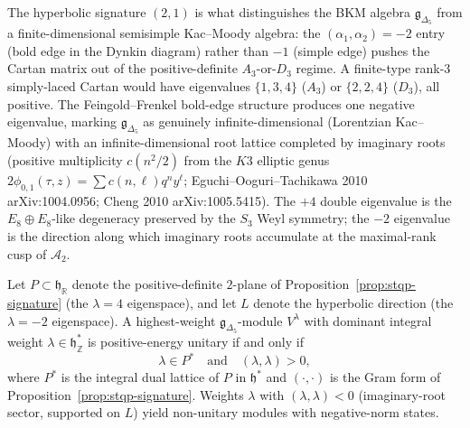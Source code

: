 \begin{remark}
\label{rem:stqp-signature-scope}
The hyperbolic signature $(2, 1)$ is what distinguishes the BKM
algebra $\mathfrak g_{\Delta_5}$ from a finite-dimensional
semisimple Kac--Moody algebra: the $(\alpha_1, \alpha_2) = -2$
entry (bold edge in the Dynkin diagram) rather than $-1$ (simple
edge) pushes the Cartan matrix out of the positive-definite
$A_3$-or-$D_3$ regime. A finite-type rank-$3$ simply-laced
Cartan would have eigenvalues $\{1, 3, 4\}$ ($A_3$) or
$\{2, 2, 4\}$ ($D_3$), all positive. The Feingold--Frenkel
bold-edge structure produces one negative eigenvalue, marking
$\mathfrak g_{\Delta_5}$ as genuinely infinite-dimensional
(Lorentzian Kac--Moody) with an infinite-dimensional root
lattice completed by imaginary roots (positive multiplicity
$c(n^2/2)$ from the $K3$ elliptic genus
$2\phi_{0,1}(\tau, z) = \sum c(n, \ell) q^n y^\ell$;
Eguchi--Ooguri--Tachikawa 2010 arXiv:1004.0956; Cheng 2010
arXiv:1005.5415). The $+4$ double eigenvalue is the
$E_8\oplus E_8$-like degeneracy preserved by the $S_3$ Weyl
symmetry; the $-2$ eigenvalue is the direction along which
imaginary roots accumulate at the maximal-rank cusp of
$\mathcal A_2$.
\end{remark}

\begin{proposition}
\label{prop:stqp-unitary-spectrum}
Let $P \subset \mathfrak h_{\mathbb R}$ denote the positive-definite
$2$-plane of Proposition~\ref{prop:stqp-signature}
(the $\lambda = 4$ eigenspace), and let $L$ denote the hyperbolic
direction (the $\lambda = -2$ eigenspace). A highest-weight
$\mathfrak g_{\Delta_5}$-module $V^\lambda$ with dominant integral
weight $\lambda \in \mathfrak h^*_{\mathbb Z}$ is positive-energy
unitary if and only if
\[
\lambda \in P^* \quad\text{and}\quad (\lambda, \lambda) > 0,
\]
where $P^*$ is the integral dual lattice of $P$ in $\mathfrak h^*$
and $(\cdot, \cdot)$ is the Gram form of
Proposition~\ref{prop:stqp-signature}.
Weights $\lambda$ with $(\lambda, \lambda) < 0$ (imaginary-root
sector, supported on $L$) yield non-unitary modules with
negative-norm states.
\end{proposition}


